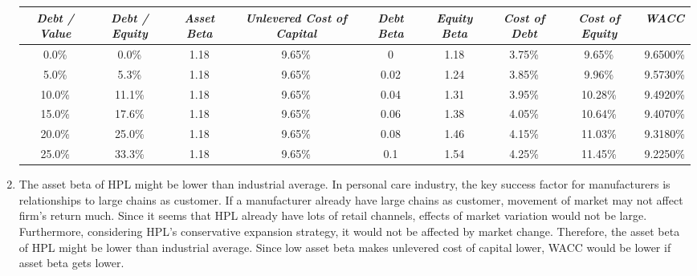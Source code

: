 \documentclass{article}
\begin{document}
\begin{enumerate}
	\begin{table}[ht]
	\tiny
	\centering
	\begin{tabular}{@{}ccccccccc@{}}
	\toprule
	\textit{Debt / Value} & \textit{Debt / Equity} & \textit{Asset Beta} & \textit{Unlevered Cost of Capital} & \textit{Debt Beta} & \textit{Equity Beta} & \textit{Cost of Debt} & 		\textit{Cost of Equity} & \textit{WACC} \\ \midrule
	0.0\%                 & 0.0\%                  & 1.18                & 9.65\%                             & 0                  & 1.18                 & 3.75\%                & 9.65\%                  & 9.6500\%      \\
	5.0\%                 & 5.3\%                  & 1.18                & 9.65\%                             & 0.02               & 1.24                 & 3.85\%                & 9.96\%                  & 9.5730\%      \\
	10.0\%                & 11.1\%                 & 1.18                & 9.65\%                             & 0.04               & 1.31                 & 3.95\%                & 10.28\%                 & 9.4920\%      \\
	15.0\%                & 17.6\%                 & 1.18                & 9.65\%                             & 0.06               & 1.38                 & 4.05\%                & 10.64\%                 & 9.4070\%      \\
	20.0\%                & 25.0\%                 & 1.18                & 9.65\%                             & 0.08               & 1.46                 & 4.15\%                & 11.03\%                 & 9.3180\%      \\
	25.0\%                & 33.3\%                 & 1.18                & 9.65\%                             & 0.1                & 1.54                 & 4.25\%                & 11.45\%                 & 9.2250\%      \\ 	\bottomrule
	\end{tabular}
	\end{table}
	\item
	The asset beta of HPL might be lower than industrial average. In personal care industry, the key success factor for manufacturers is relationships to large chains as customer. If a manufacturer already have large chains as customer, movement of market may not affect firm's return much. Since it seems that HPL already have lots of retail channels, effects of market variation would not be large. Furthermore, considering HPL's conservative expansion strategy, it would not be affected by market change. Therefore, the asset beta of HPL might be lower than industrial average. Since low asset beta makes unlevered cost of capital lower, WACC would be lower if asset beta gets lower.

\end{enumerate}
\end{document}
